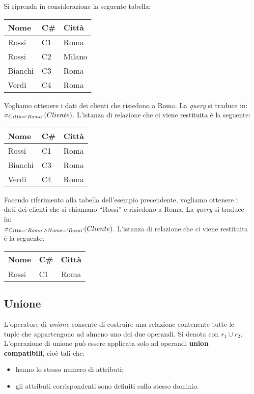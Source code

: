 \begin{exmp}
 Si riprenda in considerazione la seguente tabella:
 \begin{center}
\begin{tabular}{l |l | l}
  Nome & C\# & Città\\
  \hline
  Rossi & C1 & Roma\\
  Rossi & C2 & Milano\\
  Bianchi & C3 & Roma\\
  Verdi & C4 & Roma\\
\end{tabular}
\end{center}
Vogliamo ottenere i dati dei clienti che risiedono a Roma. La \emph{query}
si traduce in:\\$\sigma_{Citt\grave{a}=`Roma\text{'}}(Cliente)$. L'istanza di relazione che ci 
viene restituita è la seguente:
 \begin{center}
\begin{tabular}{l |l | l}
  Nome & C\# & Città\\
  \hline
  Rossi & C1 & Roma\\
  Bianchi & C3 & Roma\\
  Verdi & C4 & Roma\\
\end{tabular}
\end{center}
\end{exmp}
\begin{exmp}
Facendo riferimento alla tabella dell'esempio precendente, vogliamo ottenere i dati dei  
clienti che si chiamano ``Rossi'' e risiedono a Roma. La \emph{query}
si traduce in: \\$\sigma_{Citt\grave{a}=`Roma\text{'}\wedge Nome=`Rossi\text{'}}(Cliente)$. L'istanza 
di relazione che ci viene restituita è la seguente:
\begin{center}
\begin{tabular}{l |l | l}
  Nome & C\# & Città\\
  \hline
  Rossi & C1 & Roma\\
 \end{tabular}
 \end{center}
\end{exmp}

\subsection{Unione}
L'operatore di \emph{unione} consente di costruire una relazione contenente tutte
le tuple che appartengono ad almeno uno dei due operandi. Si denota con $r_1\cup r_2$.
L'operazione di unione può essere applicata solo ad operandi \textbf{union compatibili},
cioè tali che:
\begin{itemize}
 \item hanno lo stesso numero di attributi;
 \item gli attributi corrispondenti sono definiti sullo stesso dominio.
\end{itemize}

